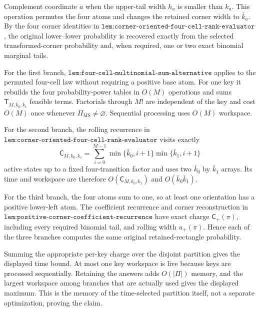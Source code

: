 Complement coordinate \(a\) when the upper-tail width \(h_a\) is smaller than \(k_a\). This operation permutes the four atoms and changes the retained corner width to \(\bar k_a\). By the four corner identities in \(\texttt{lem:corner-oriented-four-cell-rank-evaluator}\), the original lower--lower probability is recovered exactly from the selected transformed-corner probability and, when required, one or two exact binomial marginal tails.

For the first branch, \(\texttt{lem:four-cell-multinomial-sum-alternative}\) applies to the permuted four-cell law without requiring a positive base atom. For one key it rebuilds the four probability-power tables in \(O(M)\) operations and sums \(\mathsf T_{M,\bar k_0,\bar k_1}\) feasible terms. Factorials through \(M!\) are independent of the key and cost \(O(M)\) once whenever \(\Pi_{\mathrm{MS}}\ne\varnothing\). Sequential processing uses \(O(M)\) workspace.

For the second branch, the rolling recurrence in \(\texttt{lem:corner-oriented-four-cell-rank-evaluator}\) visits exactly
\[
\mathsf C_{M,k_0,k_1}=\sum_{i=0}^{M-1}\min\{\bar k_0,i+1\}\min\{\bar k_1,i+1\}
\]
active states up to a fixed four-transition factor and uses two \(\bar k_0\) by \(\bar k_1\) arrays. Its time and workspace are therefore \(O(\mathsf C_{M,k_0,k_1})\) and \(O(\bar k_0\bar k_1)\).

For the third branch, the four atoms sum to one, so at least one orientation has a positive lower-left atom. The coefficient recurrence and corner reconstruction in \(\texttt{lem:positive-corner-coefficient-recurrence}\) have exact charge \(\mathsf C_+(\pi)\), including every required binomial tail, and rolling width \(u_+(\pi)\). Hence each of the three branches computes the same original retained-rectangle probability.

Summing the appropriate per-key charge over the disjoint partition gives the displayed time bound. At most one key workspace is live because keys are processed sequentially. Retaining the answers adds \(O(|\Pi|)\) memory, and the largest workspace among branches that are actually used gives the displayed maximum. This is the memory of the time-selected partition itself, not a separate optimization, proving the claim.